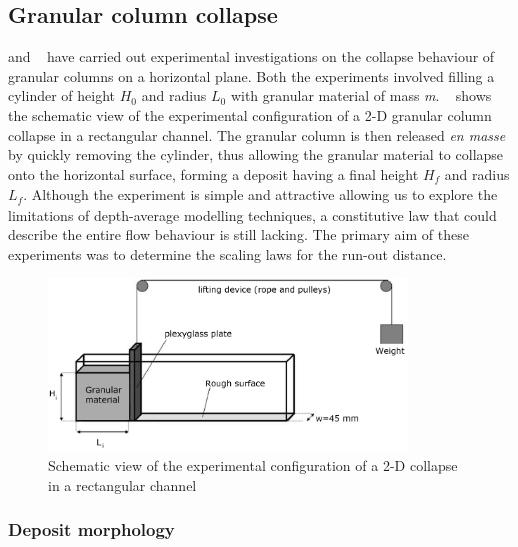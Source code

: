 \subsection{Granular column collapse}
\citet{Lube2005} and ~\citet{Lajeunesse2004} have carried out experimental 
investigations on the collapse behaviour of granular columns on a horizontal 
plane. Both the experiments involved filling a cylinder of height 
$\textit{H}_{\textit{0}}$ and radius $\textit{L}_{\textit{0}}$ with 
granular 
material of mass \textit{m}. ~ 
shows the schematic view of the experimental configuration of a 2-D granular 
column collapse in a rectangular channel. The granular column is then released 
\textit{en masse} by quickly removing the cylinder, thus allowing the granular 
material to collapse onto the horizontal surface, forming a deposit having a 
final height 
$\textit{H}_{\textit{f}}$ and radius $\textit{L}_{\textit{f}}$. Although the 
experiment is simple and attractive allowing us to explore the limitations of 
depth-average modelling techniques, a constitutive law that could describe the 
entire flow behaviour is still lacking. The primary aim of these experiments 
was to determine the scaling laws for the run-out distance.


\begin{figure}[tbhp]
\centering
\includegraphics[width=0.85\textwidth]{experiment_setup}
\caption{Schematic view of the experimental configuration of a 2-D collapse in 
a rectangular channel~\citep{Lajeunesse2004}}
\label{fig:exp}
\end{figure}

\subsubsection{Deposit morphology}


